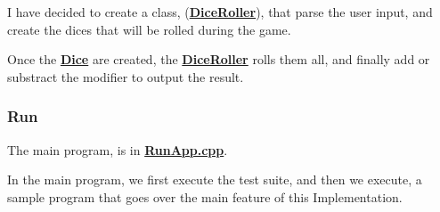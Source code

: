 I have decided to create a class, ({\bfseries \hyperlink{class_dice_roller}{Dice\+Roller}}), that parse the user input, and create the dices that will be rolled during the game.

Once the {\bfseries \hyperlink{class_dice}{Dice}} are created, the {\bfseries \hyperlink{class_dice_roller}{Dice\+Roller}} rolls them all, and finally add or substract the modifier to output the result.

\subsubsection*{Run}

The main program, is in {\bfseries \hyperlink{_run_app_8cpp}{Run\+App.\+cpp}}.

In the main program, we first execute the test suite, and then we execute, a sample program that goes over the main feature of this Implementation. 